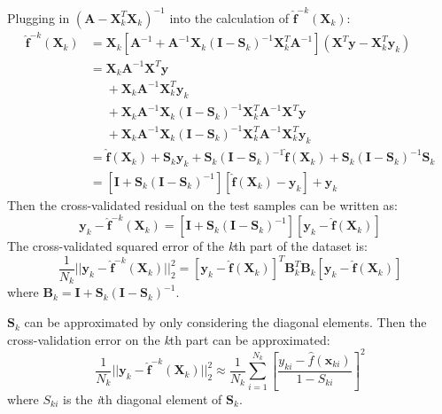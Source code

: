 \documentclass[a4paper,11pt]{article}
\begin{document}
Plugging in $(\mathbf{A} - \mathbf{X}_k^T \mathbf{X}_k)^{-1}$ into the calculation of $\hat{\mathbf{f}}^{-k} (\mathbf{X}_k)$:
\begin{align*}
\hat{\mathbf{f}}^{-k} (\mathbf{X}_k) & = 
		\mathbf{X}_k [\mathbf{A}^{-1}  + \mathbf{A}^{-1}\mathbf{X}_k (\mathbf{I} - \mathbf{S}_k)^{-1} \mathbf{X}_k^T \mathbf{A}^{-1}] (\mathbf{X}^T \mathbf{y} - \mathbf{X}_k^T \mathbf{y}_k) \\
	& =  \mathbf{X}_k\mathbf{A}^{-1}\mathbf{X}^T\mathbf{y} \\
	& \mathrel{\phantom{=}} + \mathbf{X}_k\mathbf{A}^{-1}\mathbf{X}_k^T\mathbf{y}_k \\
	& \mathrel{\phantom{=}} + \mathbf{X}_k\mathbf{A}^{-1}\mathbf{X}_k (\mathbf{I} - \mathbf{S}_k)^{-1} \mathbf{X}_k^T \mathbf{A}^{-1}\mathbf{X}^T\mathbf{y} \\
	& \mathrel{\phantom{=}} + \mathbf{X}_k\mathbf{A}^{-1}\mathbf{X}_k (\mathbf{I} - \mathbf{S}_k)^{-1} \mathbf{X}_k^T \mathbf{A}^{-1}\mathbf{X}_k^T\mathbf{y}_k \\
	& = \hat{\mathbf{f}} (\mathbf{X}_k) + \mathbf{S}_k\mathbf{y}_k 
		+ \mathbf{S}_k (\mathbf{I} - \mathbf{S}_k)^{-1} \hat{\mathbf{f}} (\mathbf{X}_k) 
		+ \mathbf{S}_k (\mathbf{I} - \mathbf{S}_k)^{-1} \mathbf{S}_k \\
	& = [\mathbf{I} + \mathbf{S}_k(\mathbf{I} - \mathbf{S}_k)^{-1}] [\hat{\mathbf{f}} (\mathbf{X}_k) - \mathbf{y}_k] + \mathbf{y}_k
\end{align*}
Then the cross-validated residual on the test samples can be written as:
\begin{equation}
\mathbf{y}_k - \hat{\mathbf{f}}^{-k} (\mathbf{X}_k) = [\mathbf{I} + \mathbf{S}_k(\mathbf{I} - \mathbf{S}_k)^{-1}] [\mathbf{y}_k - \hat{\mathbf{f}} (\mathbf{X}_k) ]
\end{equation}
The cross-validated squared error of the \textit{k}th part of the dataset is:
\begin{equation}
\frac{1}{N_k} ||\mathbf{y}_k - \hat{\mathbf{f}}^{-k} (\mathbf{X}_k)||_2^2 = [\mathbf{y}_k - \hat{\mathbf{f}} (\mathbf{X}_k) ]^T
	\mathbf{B}_k^T \mathbf{B}_k [\mathbf{y}_k - \hat{\mathbf{f}} (\mathbf{X}_k) ]
\end{equation}
where $\mathbf{B}_k = \mathbf{I} + \mathbf{S}_k(\mathbf{I} - \mathbf{S}_k)^{-1}$.

$\mathbf{S}_k$ can be approximated by only considering the diagonal elements. Then the cross-validation error on the \textit{k}th part can be approximated:
\begin{equation}
\frac{1}{N_k} ||\mathbf{y}_k - \hat{\mathbf{f}}^{-k} (\mathbf{X}_k)||_2^2 \approx
\frac{1}{N_k} \sum_{i=1}^{N_k} \left[ \frac{y_{ki} - \hat{f}(\mathbf{x}_{ki})} {1 - S_{ki}} \right]^2
\end{equation}
where $S_{ki}$ is the \textit{i}th diagonal element of $\mathbf{S}_k$.
\end{document}
